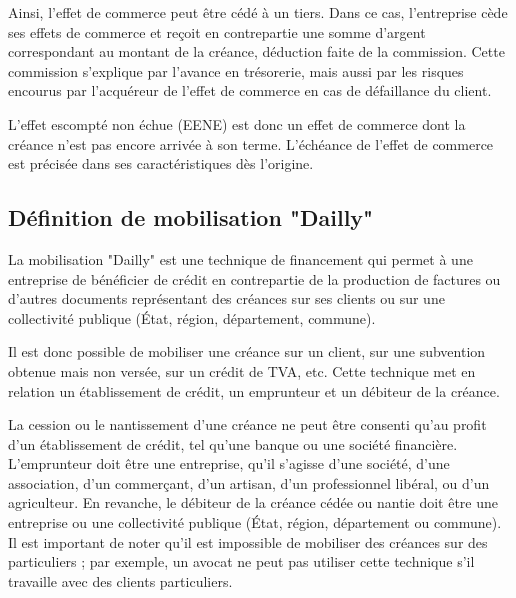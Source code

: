 \documentclass[a4paper, 12pt]{report}
\begin{document}
Ainsi, l'effet de commerce peut être cédé à un tiers. Dans ce cas, l'entreprise cède ses effets de commerce et reçoit en contrepartie une somme d'argent correspondant au montant de la créance, déduction faite de la commission. Cette commission s'explique par l'avance en trésorerie, mais aussi par les risques encourus par l'acquéreur de l'effet de commerce en cas de défaillance du client.

L'effet escompté non échue (EENE) est donc un effet de commerce dont la créance n'est pas encore arrivée à son terme. L'échéance de l'effet de commerce est précisée dans ses caractéristiques dès l'origine.

\subsection{Définition de mobilisation "Dailly"}

La mobilisation "Dailly" est une technique de financement qui permet à une entreprise de bénéficier de crédit en contrepartie de la production de factures ou d'autres documents représentant des créances sur ses clients ou sur une collectivité publique (État, région, département, commune). 

Il est donc possible de mobiliser une créance sur un client, sur une subvention obtenue mais non versée, sur un crédit de TVA, etc. Cette technique met en relation un établissement de crédit, un emprunteur et un débiteur de la créance.

La cession ou le nantissement d'une créance ne peut être consenti qu'au profit d'un établissement de crédit, tel qu'une banque ou une société financière. L'emprunteur doit être une entreprise, qu'il s'agisse d'une société, d'une association, d'un commerçant, d'un artisan, d'un professionnel libéral, ou d'un agriculteur. En revanche, le débiteur de la créance cédée ou nantie doit être une entreprise ou une collectivité publique (État, région, département ou commune). Il est important de noter qu'il est impossible de mobiliser des créances sur des particuliers ; par exemple, un avocat ne peut pas utiliser cette technique s'il travaille avec des clients particuliers.
\end{document}
